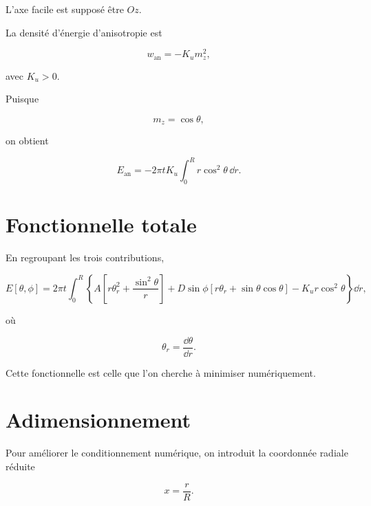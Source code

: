 \documentclass[a4paper,11pt]{article}
\begin{document}
L'axe facile est supposé être $Oz$.

La densité d'énergie d'anisotropie est

\begin{equation}
w_{\mathrm{an}}
=
-K_u m_z^2,
\end{equation}

avec $K_u>0$.

Puisque

\begin{equation}
m_z=\cos\theta,
\end{equation}

on obtient

\begin{equation}
E_{\mathrm{an}}
=
-2\pi tK_u
\int_0^R
r\cos^2\theta
\,\dd r.
\end{equation}

\section{Fonctionnelle totale}

En regroupant les trois contributions,

\begin{equation}
\boxed{
E[\theta,\phi]
=
2\pi t
\int_0^R
\left\{
A
\left[
r\theta_r^2
+
\frac{\sin^2\theta}{r}
\right]
+
D\sin\phi
\left[
r\theta_r
+
\sin\theta\cos\theta
\right]
-
K_u r\cos^2\theta
\right\}
\dd r,
}
\end{equation}

où

\begin{equation}
\theta_r
=
\frac{\dd\theta}{\dd r}.
\end{equation}

Cette fonctionnelle est celle que l'on cherche à minimiser numériquement.

\section{Adimensionnement}

Pour améliorer le conditionnement numérique, on introduit la coordonnée
radiale réduite

\begin{equation}
\boxed{
x=\frac{r}{R}.
}
\end{equation}
\end{document}
